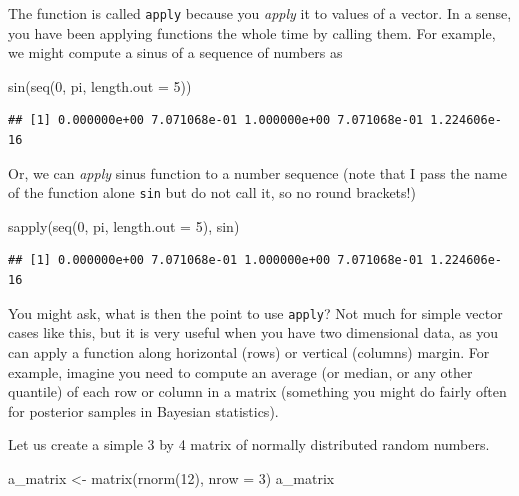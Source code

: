 \documentclass[
]{book}
\newenvironment{Shaded}{\begin{snugshade}}{\end{snugshade}}
\newcommand{\AttributeTok}[1]{\textcolor[rgb]{0.77,0.63,0.00}{#1}}
\newcommand{\DecValTok}[1]{\textcolor[rgb]{0.00,0.00,0.81}{#1}}
\newcommand{\FunctionTok}[1]{\textcolor[rgb]{0.00,0.00,0.00}{#1}}
\newcommand{\NormalTok}[1]{#1}
\newcommand{\OtherTok}[1]{\textcolor[rgb]{0.56,0.35,0.01}{#1}}
\begin{document}
The function is called \texttt{apply} because you \emph{apply} it to values of a vector. In a sense, you have been applying functions the whole time by calling them. For example, we might compute a sinus of a sequence of numbers as

\begin{Shaded}
\begin{Highlighting}[]
\FunctionTok{sin}\NormalTok{(}\FunctionTok{seq}\NormalTok{(}\DecValTok{0}\NormalTok{, pi, }\AttributeTok{length.out =} \DecValTok{5}\NormalTok{))}
\end{Highlighting}
\end{Shaded}

\begin{verbatim}
## [1] 0.000000e+00 7.071068e-01 1.000000e+00 7.071068e-01 1.224606e-16
\end{verbatim}

Or, we can \emph{apply} sinus function to a number sequence (note that I pass the name of the function alone \texttt{sin} but do not call it, so no round brackets!)

\begin{Shaded}
\begin{Highlighting}[]
\FunctionTok{sapply}\NormalTok{(}\FunctionTok{seq}\NormalTok{(}\DecValTok{0}\NormalTok{, pi, }\AttributeTok{length.out =} \DecValTok{5}\NormalTok{), sin)}
\end{Highlighting}
\end{Shaded}

\begin{verbatim}
## [1] 0.000000e+00 7.071068e-01 1.000000e+00 7.071068e-01 1.224606e-16
\end{verbatim}

You might ask, what is then the point to use \texttt{apply}? Not much for simple vector cases like this, but it is very useful when you have two dimensional data, as you can apply a function along horizontal (rows) or vertical (columns) margin. For example, imagine you need to compute an average (or median, or any other quantile) of each row or column in a matrix (something you might do fairly often for posterior samples in Bayesian statistics).

Let us create a simple 3 by 4 matrix of normally distributed random numbers.

\begin{Shaded}
\begin{Highlighting}[]
\NormalTok{a\_matrix }\OtherTok{\textless{}{-}} \FunctionTok{matrix}\NormalTok{(}\FunctionTok{rnorm}\NormalTok{(}\DecValTok{12}\NormalTok{), }\AttributeTok{nrow =} \DecValTok{3}\NormalTok{)}
\NormalTok{a\_matrix}
\end{Highlighting}
\end{Shaded}
\end{document}
